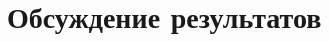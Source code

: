 \begin{figure}[h]
   \begin{minipage}[h]{0.49\linewidth}
   \end{minipage}
   \hfill
   \begin{minipage}[h]{0.49\linewidth}
   \end{minipage}
\end{figure}
\section{Обсуждение результатов}